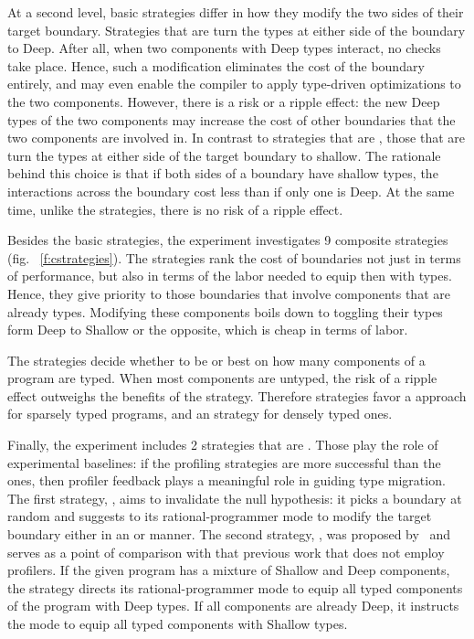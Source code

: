  At a second level, basic strategies differ in how they modify the two sides of
 their target boundary. Strategies that are \optkw{} turn the types at
 either side of the boundary to Deep. After all, when two components with
 Deep types interact, no checks take place. Hence, such a modification
 eliminates the cost of the boundary entirely, and may even enable the
 compiler to apply type-driven optimizations to the two components. 
 However, there is a risk or
 a ripple effect: the new Deep types of the two components may increase
 the cost of other boundaries that the two components are involved in. In
 contrast to strategies that are \optkw{}, those that are \conkw{} turn
 the types at either side of the target boundary to shallow. The rationale
 behind this choice is that if both sides of a boundary have
 shallow types, the interactions across the boundary cost less than if
 only one is Deep. At the same time, unlike the  \optkw{}
 strategies,  there is no risk of a ripple effect. 

 Besides the basic strategies, the experiment investigates 9 composite
 strategies (fig. ~\ref{f:cstrategies}). The \costkw{} strategies rank the
 cost of boundaries not just in terms of performance, but also in terms of
 the labor needed to equip then with types.  Hence, they give priority to
 those boundaries that involve components that are already types.
 Modifying these components boils down to toggling their types form Deep
 to Shallow or the opposite, which is cheap in terms of labor. 
 
 The \confkw{} strategies decide whether to be
 \optkw{} or \conkw{} best on how many components of a program are typed.
 When most components are untyped, the risk of a ripple effect outweighs
 the benefits of the \optkw{} strategy. Therefore strategies favor a
 \conkw{} approach for sparsely typed programs, and an \optkw{} strategy
 for densely typed ones.

 Finally, the experiment includes 2 strategies that are \agnostickw{}.
 Those play the role of experimental baselines: if the profiling
 strategies are more successful than the \agnostickw{} ones, then profiler
 feedback plays a meaningful role in guiding type migration.  The first
 \agnostickw{} strategy, \randkw{}, aims to invalidate the null
 hypothesis: it picks a boundary at random and suggests to its
 rational-programmer mode to modify the target boundary either in an
 \optkw{} or \conkw{} manner.  The second \agnostickw{} strategy,
 \togglekw{}, was proposed by~\citep{g-dsgt} and serves as a point of
 comparison with that previous work that does not employ profilers. If the
 given program has a mixture of Shallow and Deep components, the strategy
 directs its rational-programmer mode to equip all typed components of the
 program with Deep types. If all components are already Deep, it instructs
 the mode to equip all typed components with Shallow types. 

